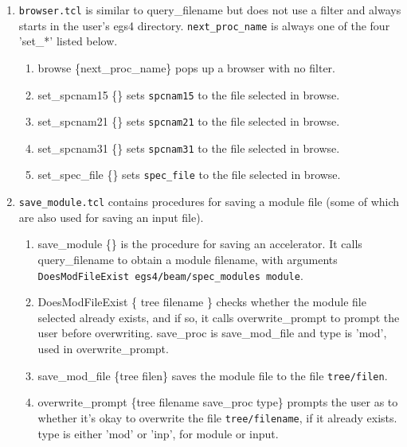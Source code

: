 \documentclass[12pt]{book}
\begin{document}
\begin{enumerate}
\item {\tt browser.tcl} is similar to {\sf query\_filename} but does not use a
filter and always starts in the user's egs4 directory.  {\tt next\_proc\_name}
is always one of the four 'set\_*' listed below.
\begin{enumerate}
\item {\sf browse \{next\_proc\_name\}} pops up a browser with no filter.
\item {\sf set\_spcnam15 \{\}} sets {\tt spcnam15} to the file selected
in browse.
\item {\sf set\_spcnam21 \{\}} sets {\tt spcnam21} to the file selected
in browse.
\item {\sf set\_spcnam31 \{\}} sets {\tt spcnam31} to the file selected
in browse.
\item {\sf set\_spec\_file \{\}} sets {\tt spec\_file} to the file
selected in browse.
\end{enumerate}

\item {\tt save\_module.tcl} contains procedures for saving a module file
(some of which are also used for saving an input file).
\begin{enumerate}
\item {\sf save\_module \{\}} is the procedure for saving an accelerator.  It
calls query\_filename to obtain a module filename, with arguments
{\tt DoesModFileExist egs4/beam/spec\_modules module}.
\item {\sf DoesModFileExist \{ tree filename \}} checks whether the module
file selected already exists, and if so, it calls {\sf overwrite\_prompt} to
prompt the user before overwriting.  {\sf save\_proc} is {\sf
save\_mod\_file} and type is 'mod', used in {\sf overwrite\_prompt}.
\item {\sf save\_mod\_file \{tree filen\}} saves the module file to the file
{\tt tree/filen}.
\item {\sf overwrite\_prompt \{tree filename save\_proc type\}} prompts the
user as to whether it's okay to overwrite the file {\tt tree/filename}, if it
already exists.  type is either 'mod' or 'inp', for module or input.
\end{enumerate}


\end{enumerate}
\end{document}
